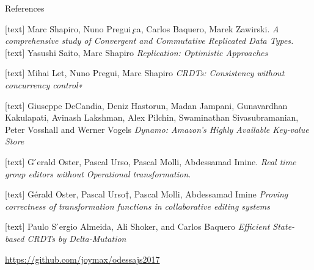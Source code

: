 \documentclass{beamer}
\begin{document}
\begin{frame}{References}

\begin{thebibliography}{9}
[text]
Marc Shapiro, Nuno Pregui ̧ca, Carlos Baquero, Marek Zawirski. 
\textit{A comprehensive study of Convergent and Commutative Replicated Data Types.}
[text]
Yasushi Saito, Marc Shapiro
\textit{Replication: Optimistic Approaches}

[text]
Mihai Let, Nuno Pregui, Marc Shapiro
\textit{CRDTs: Consistency without concurrency control∗}

[text]
Giuseppe DeCandia, Deniz Hastorun, Madan Jampani, Gunavardhan Kakulapati, Avinash Lakshman, Alex Pilchin, Swaminathan Sivasubramanian, Peter Vosshall and Werner Vogels
\textit{Dynamo: Amazon’s Highly Available Key-value Store}

[text]
G ́erald Oster, Pascal Urso, Pascal Molli, Abdessamad Imine. 
\textit{Real time group editors without Operational transformation.}

[text]
Gérald Oster, Pascal Urso†, Pascal Molli, Abdessamad Imine
\textit{Proving correctness of transformation functions in collaborative editing systems}

[text]
Paulo S ́ergio Almeida, Ali Shoker, and Carlos Baquero
\textit{Efficient State-based CRDTs by Delta-Mutation}

\end{thebibliography}	

\end{frame}


\begin{frame}

\vspace{1cm}
\begin{footnotesize}
\href{https://github.com/joymax/odessajs2017}{https://github.com/joymax/odessajs2017}
\end{footnotesize}

\end{frame}
\end{document}
